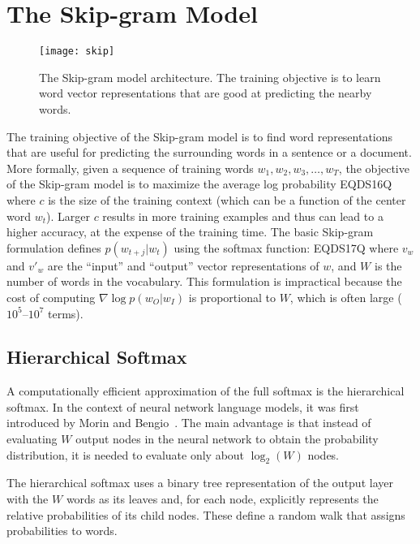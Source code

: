 \documentclass{article}
\begin{document}
\section{The Skip-gram Model}

\begin{figure}[t]
\vspace{-0.8cm}
\centering
\centerline{\texttt{[image: skip]}}
\vspace{-3.2cm}
\caption{\small\label{fig:skip}The Skip-gram model architecture. The training objective
  is to learn word vector representations that are good at predicting the nearby words.}
\end{figure}

The training objective of the Skip-gram model is to find word
representations that are useful for predicting the surrounding words in a sentence
or a document.
More formally, given a sequence of training words $w_1, w_2,
w_3,\ldots,w_T$, the objective of the Skip-gram model is to maximize
the average log probability
EQDS16Q
where $c$ is the size of the training context (which can be a function
of the center word $w_t$). Larger $c$ results in more
training examples and thus can lead to a higher accuracy, at the
expense of the training time. The basic Skip-gram formulation defines
$p(w_{t+j}|w_t)$ using the softmax function:
EQDS17Q
where $v_w$ and $v'_w$ are the ``input'' and ``output'' vector representations
of $w$, and $W$ is the number of words in the vocabulary. This
formulation is impractical because the cost of computing $\nabla \log
p(w_O|w_I)$ is proportional to $W$, which is often large
($10^5$--$10^7$ terms).

\subsection{Hierarchical Softmax}
\label{sec:hsoft}

A computationally efficient approximation of the full softmax is the hierarchical softmax.
In the context of neural network language models, it was first
introduced by Morin and Bengio~\cite{hsoft_first}. The main
advantage is that instead of evaluating $W$ output nodes in the neural network to obtain
the probability distribution, it is needed to evaluate only about $\log_2(W)$ nodes.

The hierarchical softmax uses a binary tree representation of the output layer
with the $W$ words as its leaves and, for each
node, explicitly represents the relative probabilities of its child
nodes. These define a random walk that assigns probabilities to words.
\end{document}
